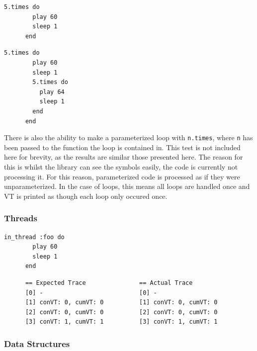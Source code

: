 \documentclass[11pt, abstracton, twoside]{scrartcl}
\begin{document}
\begin{minipage}{\textwidth}
	\begin{lstlisting}[style = sonicpi]
      5.times do
        play 60
        sleep 1
      end
	\end{lstlisting}
\end{minipage}

\begin{minipage}{\textwidth}
	\begin{lstlisting}[style = sonicpi]
      5.times do
        play 60
        sleep 1
        5.times do
          play 64
          sleep 1
        end
      end
	\end{lstlisting}
\end{minipage}

There is also the ability to make a parameterized loop with \texttt{n.times},
where \texttt{n} has been passed to the function the loop is contained in. This
test is not included here for brevity, as the results are similar those presented
here. The reason for this is whilst the library can see the symbols easily,
the code is currently not processing it. For this reason, parameterized code
is processed as if they were unparameterized. In the case of loops, this means
all loops are handled once and VT is printed as though each loop only occured once.

\subsubsection{Threads}
\begin{minipage}{\textwidth}
	\begin{lstlisting}[style = sonicpi]
      in_thread :foo do
        play 60
        sleep 1
      end
	\end{lstlisting}
\end{minipage}
\begin{lstlisting}
      == Expected Trace               == Actual Trace
      [0] -                           [0] -
      [1] conVT: 0, cumVT: 0          [1] conVT: 0, cumVT: 0
      [2] conVT: 0, cumVT: 0          [2] conVT: 0, cumVT: 0
      [3] conVT: 1, cumVT: 1          [3] conVT: 1, cumVT: 1
\end{lstlisting}

\subsubsection{Data Structures}
\end{document}
